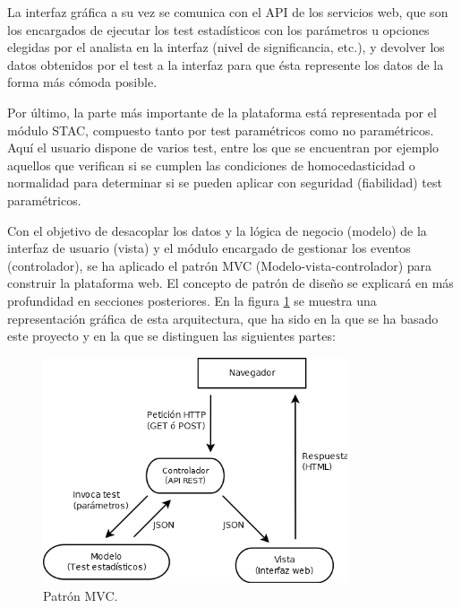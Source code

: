 La interfaz gráfica a su vez se comunica con el API de los servicios web, que son los encargados de ejecutar los test estadísticos con los parámetros u opciones elegidas por el analista en la interfaz (nivel de significancia, etc.), y devolver los datos obtenidos por el test a la interfaz para que ésta represente los datos de la forma más cómoda posible.

Por último, la parte más importante de la plataforma está representada por el módulo STAC, compuesto tanto por test paramétricos como no paramétricos. Aquí el usuario dispone de varios test, entre los que se encuentran por ejemplo aquellos que verifican si se cumplen las condiciones de homocedasticidad o normalidad para determinar si se pueden aplicar con seguridad (fiabilidad) test paramétricos.

Con el objetivo de desacoplar los datos y la lógica de negocio (modelo) de la interfaz de usuario (vista) y el módulo encargado de gestionar los eventos (controlador), se ha aplicado el patrón MVC (Modelo-vista-controlador) para construir la plataforma web. El concepto de patrón de diseño se explicará en más profundidad en secciones posteriores. En la figura \ref{fig:mvc} se muestra una representación gráfica de esta arquitectura, que ha sido en la que se ha basado este proyecto y en la que se distinguen las siguientes partes:

\begin{figure}[H]
\centering
\includegraphics[width=9cm]{figuras/mvc.png}
\caption{Patrón MVC.}
\label{fig:mvc}
\end{figure}

